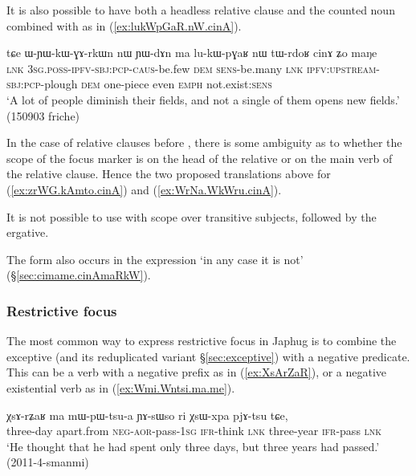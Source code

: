 It is also possible to have both a headless relative clause and the counted noun  combined with  as in (\ref{ex:lukWpGaR.nW.cinA}).

  \begin{exe}
\ex \label{ex:lukWpGaR.nW.cinA}
\gll tɕe ɯ-ɲɯ-kɯ-ɣɤ-rkɯn nɯ ɲɯ-dɤn ma lu-kɯ-pɣaʁ nɯ tɯ-rdoʁ cinɤ ʑo maŋe\\
\textsc{lnk} \textsc{3sg}.\textsc{poss}-\textsc{ipfv}-\textsc{sbj}:\textsc{pcp}-\textsc{caus}-be.few \textsc{dem} \textsc{sens}-be.many \textsc{lnk} \textsc{ipfv}:\textsc{upstream}-\textsc{sbj}:\textsc{pcp}-plough \textsc{dem} one-piece even \textsc{emph} not.exist:\textsc{sens}\\
\glt `A lot of people diminish their fields, and not a single of them opens new fields.' (150903 friche)
\end{exe}

In the case of relative clauses before , there is some ambiguity as to whether the scope of the focus marker is on the head of the relative or on the main verb of the relative clause. Hence the two proposed translations above for (\ref{ex:zrWG.kAmto.cinA}) and (\ref{ex:WrNa.WkWru.cinA}).

It is not possible to use  with scope over transitive subjects, followed by the ergative.

The form  also occurs in the expression  `in any case it is not' (§\ref{sec:cimame.cinAmaRkW}).


\subsubsection{Restrictive focus} \label{sec:restrictive.focus} 
 The most common way to express restrictive focus in Japhug is to combine the exceptive  (and its reduplicated variant  §\ref{sec:exceptive}) with a negative predicate. This can be a verb with a negative prefix as in (\ref{ex:XsArZaR}), or a negative existential verb as in (\ref{ex:Wmi.Wntsi.ma.me}).
 
 \begin{exe}
\ex  \label{ex:XsArZaR}
\gll   χsɤ-rʑaʁ ma mɯ-pɯ-tsu-a ɲɤ-sɯso ri χsɯ-xpa pjɤ-tsu tɕe,  \\
three-day apart.from \textsc{neg}-\textsc{aor}-pass-\textsc{1sg} \textsc{ifr}-think \textsc{lnk} three-year \textsc{ifr}-pass \textsc{lnk} \\
\glt `He thought that he had spent only three days, but three years had passed.' (2011-4-smanmi)
  \end{exe}
 
